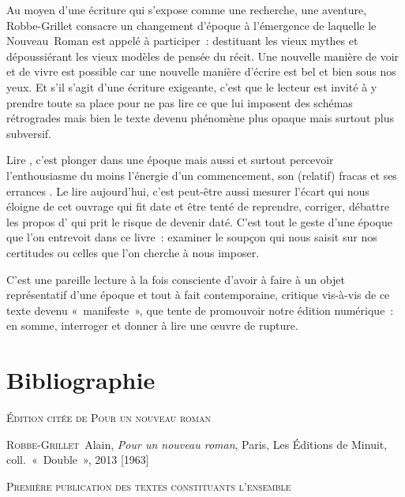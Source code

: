 \documentclass[12pt, a4paper]{article}
\begin{document}
Au moyen d'une écriture qui s'expose comme une recherche, une aventure, Robbe-Grillet consacre un changement d'époque à l'émergence de laquelle le Nouveau~Roman est appelé à participer~: destituant les vieux mythes et dépoussiérant les vieux modèles de pensée du récit. Une nouvelle manière de voir et de vivre est possible car une nouvelle manière d'écrire est bel et bien sous nos yeux. Et s'il s'agit d'une écriture exigeante, c'est que le lecteur est invité à y prendre toute sa place pour ne pas lire ce que lui imposent des schémas rétrogrades mais bien le texte devenu phénomène plus opaque mais surtout plus subversif.

Lire \punr, c'est plonger dans une époque mais aussi et surtout percevoir l'enthousiasme du moins l'énergie d'un commencement, son (relatif) fracas et ses errances %
. Le lire aujourd'hui, c'est peut-être aussi mesurer l'écart qui nous éloigne de cet ouvrage qui fit date et être tenté de reprendre, corriger, débattre les propos d'\robbe{} qui prit le risque de devenir daté. C'est tout le geste d'une époque que l'on entrevoit dans ce livre~: examiner le soupçon qui nous saisit sur nos certitudes ou celles que l'on cherche à nous imposer.

C'est une pareille lecture à la fois consciente d'avoir à faire à un objet représentatif d'une époque et tout à fait contemporaine, critique vis-à-vis de ce texte devenu «~manifeste~», que tente de promouvoir notre édition numérique~: en somme, interroger et donner à lire une œuvre de rupture.




\newpage
\section{Bibliographie}
	
		
		\vspace*{2cm}
		\setlength{\parindent}{0cm}
{\large\textsc{Édition citée de Pour un nouveau roman}}
		\vspace*{1cm}
		\setlength{\parindent}{25pt}
		
		
		

		
		\textsc{Robbe-Grillet}~Alain, \textit{Pour un nouveau roman}, Paris, Les Éditions de Minuit, coll.~«~Double~», 2013 [1963]\par 
	
		\vspace*{2cm}
		\setlength{\parindent}{0cm}
{\large\textsc{Première publication des textes constituants l'ensemble}}
		\vspace*{1cm}
		\setlength{\parindent}{25pt}
		
\end{document}
